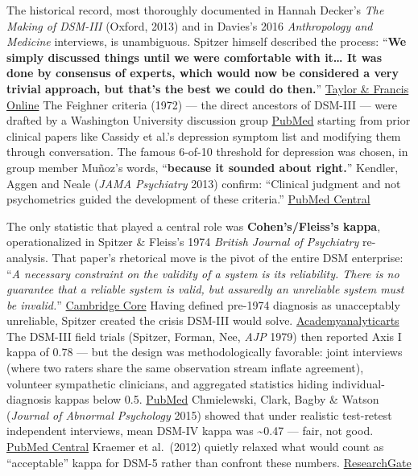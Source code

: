 The historical record, most thoroughly documented in Hannah Decker's \emph{The Making of DSM-III} (Oxford, 2013) and in Davies's 2016 \emph{Anthropology and Medicine} interviews, is unambiguous. Spitzer himself described the process: ``\textbf{We simply discussed things until we were comfortable with it\ldots{} It was done by consensus of experts, which would now be considered a very trivial approach, but that's the best we could do then.}'' \href{https://www.tandfonline.com/doi/full/10.1080/13648470.2016.1226684}{Taylor \& Francis Online} The Feighner criteria (1972) --- the direct ancestors of DSM-III --- were drafted by a Washington University discussion group \href{https://pubmed.ncbi.nlm.nih.gov/20008944/}{PubMed} starting from prior clinical papers like Cassidy et al.'s depression symptom list and modifying them through conversation. The famous 6-of-10 threshold for depression was chosen, in group member Muñoz's words, ``\textbf{because it sounded about right.}'' Kendler, Aggen and Neale (\emph{JAMA Psychiatry} 2013) confirm: ``Clinical judgment and not psychometrics guided the development of these criteria.'' \href{https://pmc.ncbi.nlm.nih.gov/articles/PMC3800168/}{PubMed Central}

The only statistic that played a central role was \textbf{Cohen's/Fleiss's kappa}, operationalized in Spitzer \& Fleiss's 1974 \emph{British Journal of Psychiatry} re-analysis. That paper's rhetorical move is the pivot of the entire DSM enterprise: ``\emph{A necessary constraint on the validity of a system is its reliability. There is no guarantee that a reliable system is valid, but assuredly an unreliable system must be invalid.}'' \href{https://www.cambridge.org/core/journals/the-british-journal-of-psychiatry/article/abs/reanalysis-of-the-reliability-of-psychiatric-diagnosis/FEBECBB1AEB68DA969F897333B8003E3}{Cambridge Core} Having defined pre-1974 diagnosis as unacceptably unreliable, Spitzer created the crisis DSM-III would solve. \href{https://academyanalyticarts.org/kirk-myth-reliability-dsm}{Academyanalyticarts} The DSM-III field trials (Spitzer, Forman, Nee, \emph{AJP} 1979) then reported Axis I kappa of 0.78 --- but the design was methodologically favorable: joint interviews (where two raters share the same observation stream inflate agreement), volunteer sympathetic clinicians, and aggregated statistics hiding individual-diagnosis kappas below 0.5. \href{https://pubmed.ncbi.nlm.nih.gov/443467/}{PubMed} Chmielewski, Clark, Bagby \& Watson (\emph{Journal of Abnormal Psychology} 2015) showed that under realistic test-retest independent interviews, mean DSM-IV kappa was \textasciitilde0.47 --- fair, not good. \href{https://pmc.ncbi.nlm.nih.gov/articles/PMC4573819/}{PubMed Central} Kraemer et al.~(2012) quietly relaxed what would count as ``acceptable'' kappa for DSM-5 rather than confront these numbers. \href{https://www.researchgate.net/publication/264796782_Reliability_in_Psychiatric_Diagnosis_with_the_DSM_Old_Wine_in_New_Barrels}{ResearchGate}

